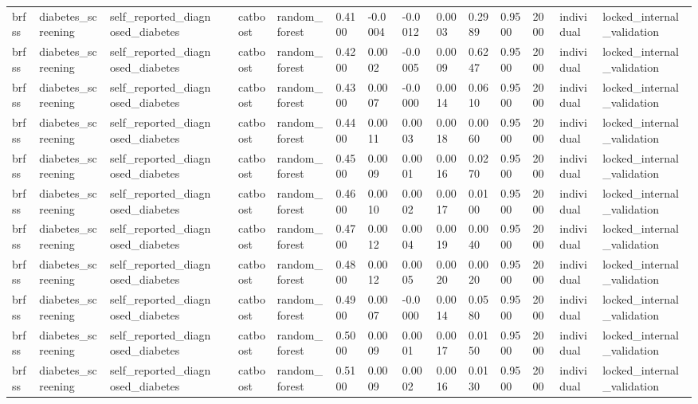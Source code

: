 \begin{tabular}{lllllllllllllll}
brfss & diabetes\_screening & self\_reported\_diagnosed\_diabetes &  & catboost & random\_forest & 0.4100 & -0.0004 & -0.0012 & 0.0003 & 0.2989 & 0.9500 & 2000 & individual & locked\_internal\_validation \\
brfss & diabetes\_screening & self\_reported\_diagnosed\_diabetes &  & catboost & random\_forest & 0.4200 & 0.0002 & -0.0005 & 0.0009 & 0.6247 & 0.9500 & 2000 & individual & locked\_internal\_validation \\
brfss & diabetes\_screening & self\_reported\_diagnosed\_diabetes &  & catboost & random\_forest & 0.4300 & 0.0007 & -0.0000 & 0.0014 & 0.0610 & 0.9500 & 2000 & individual & locked\_internal\_validation \\
brfss & diabetes\_screening & self\_reported\_diagnosed\_diabetes &  & catboost & random\_forest & 0.4400 & 0.0011 & 0.0003 & 0.0018 & 0.0060 & 0.9500 & 2000 & individual & locked\_internal\_validation \\
brfss & diabetes\_screening & self\_reported\_diagnosed\_diabetes &  & catboost & random\_forest & 0.4500 & 0.0009 & 0.0001 & 0.0016 & 0.0270 & 0.9500 & 2000 & individual & locked\_internal\_validation \\
brfss & diabetes\_screening & self\_reported\_diagnosed\_diabetes &  & catboost & random\_forest & 0.4600 & 0.0010 & 0.0002 & 0.0017 & 0.0100 & 0.9500 & 2000 & individual & locked\_internal\_validation \\
brfss & diabetes\_screening & self\_reported\_diagnosed\_diabetes &  & catboost & random\_forest & 0.4700 & 0.0012 & 0.0004 & 0.0019 & 0.0040 & 0.9500 & 2000 & individual & locked\_internal\_validation \\
brfss & diabetes\_screening & self\_reported\_diagnosed\_diabetes &  & catboost & random\_forest & 0.4800 & 0.0012 & 0.0005 & 0.0020 & 0.0020 & 0.9500 & 2000 & individual & locked\_internal\_validation \\
brfss & diabetes\_screening & self\_reported\_diagnosed\_diabetes &  & catboost & random\_forest & 0.4900 & 0.0007 & -0.0000 & 0.0014 & 0.0580 & 0.9500 & 2000 & individual & locked\_internal\_validation \\
brfss & diabetes\_screening & self\_reported\_diagnosed\_diabetes &  & catboost & random\_forest & 0.5000 & 0.0009 & 0.0001 & 0.0017 & 0.0150 & 0.9500 & 2000 & individual & locked\_internal\_validation \\
brfss & diabetes\_screening & self\_reported\_diagnosed\_diabetes &  & catboost & random\_forest & 0.5100 & 0.0009 & 0.0002 & 0.0016 & 0.0130 & 0.9500 & 2000 & individual & locked\_internal\_validation \\

\end{tabular}
